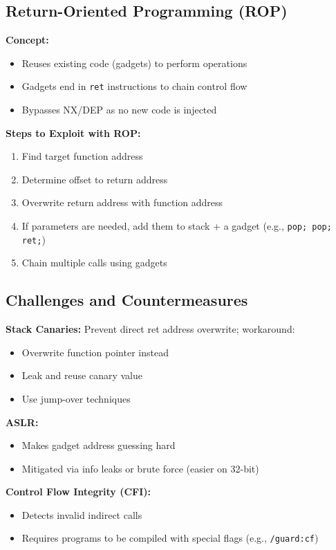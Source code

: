 \subsection{Return-Oriented Programming (ROP)}
{
\textbf{Concept:}
\begin{itemize}[noitemsep]
  \item Reuses existing code (gadgets) to perform operations
  \item Gadgets end in \texttt{ret} instructions to chain control flow
  \item Bypasses NX/DEP as no new code is injected
\end{itemize}

\textbf{Steps to Exploit with ROP:}
\begin{enumerate}[noitemsep]
  \item Find target function address
  \item Determine offset to return address
  \item Overwrite return address with function address
  \item If parameters are needed, add them to stack + a gadget (e.g., \texttt{pop; pop; ret;})
  \item Chain multiple calls using gadgets
\end{enumerate}
}

\subsection{Challenges and Countermeasures}
{
\textbf{Stack Canaries:} Prevent direct ret address overwrite; workaround:
\begin{itemize}[noitemsep]
  \item Overwrite function pointer instead
  \item Leak and reuse canary value
  \item Use jump-over techniques
\end{itemize}

\textbf{ASLR:}
\begin{itemize}[noitemsep]
  \item Makes gadget address guessing hard
  \item Mitigated via info leaks or brute force (easier on 32-bit)
\end{itemize}

\textbf{Control Flow Integrity (CFI):}
\begin{itemize}[noitemsep]
  \item Detects invalid indirect calls
  \item Requires programs to be compiled with special flags (e.g., \texttt{/guard:cf})
\end{itemize}
}

